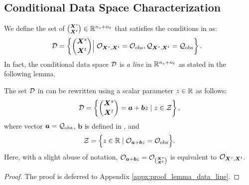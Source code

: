 \subsection{Conditional Data Space Characterization} \label{subsec:conditional_data_space}

We define the set of ${\bm X^s \choose \bm X^t } \in \mathbb{R}^{n_s + n_t}$ that satisfies the conditions in  as:
%
\begin{align} \label{eq:conditional_data_space}
	\hspace{-2.5mm}\cD = \left \{ 
	{\bm X^s \choose \bm X^t } \Big | ~
	\cO_{\bm X^s, \bm X^t}
	=
	\cO_{\rm obs}, 
	\cQ_{\bm X^s, \bm X^t}
	=
	\cQ_{\rm obs}
	\right \}. 
\end{align}
%
In fact, the conditional data space ${\mathcal D}$ is \emph{a line} in $\mathbb{R}^{n_s + n_t}$ as stated in the following lemma. 
%
\begin{lemma} \label{lemma:data_line}
The set ${\mathcal D}$ in  can be rewritten using a scalar parameter $z \in \mathbb{R}$ as follows:
%
\begin{align} \label{eq:conditional_data_space_line}
	{\mathcal D} = \left \{ {\bm X^s \choose \bm X^t } = \bm a + \bm b z \mid z \in {\mathcal Z} \right \},
\end{align}
%
where vector $\bm a = {\mathcal Q}_{\rm obs}$, $\bm b$ is defined in , and
%
\begin{align} \label{eq:cZ}
	{\mathcal Z} = \Big \{ 
	z \in \mathbb{R} 
	\mid 
	{\mathcal O}_{\bm a + \bm b z} = {\mathcal O}_{\rm obs}
	\Big \}.
\end{align}
Here, with a slight abuse of notation, 
$
{\mathcal O}_{\bm a + \bm b z} = {\mathcal O}_{{\bm X^s \choose \bm X^t }}
$
is equivalent to ${\mathcal O}_{\bm X^s, \bm X^t}$.
\end{lemma}
%
\begin{proof}
The proof is deferred to Appendix \ref{appx:proof_lemma_data_line}.
\end{proof}


